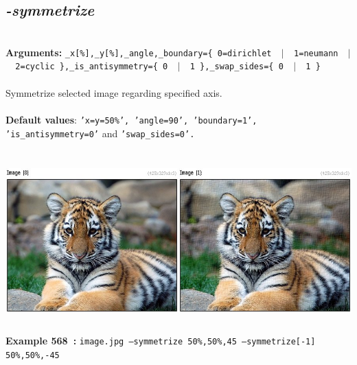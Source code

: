 \documentclass[a4paper,11pt,twoside]{book}
\begin{document}
\subsection{\emph{-symmetrize} }\vspace*{-0.5em}
~\\\textbf{Arguments: } 
{\small \texttt{\_x[\%],\_y[\%],\_angle,\_boundary=\{ 0=dirichlet ~$|$~ 1=neumann ~$|$~ 2=cyclic \},\_is\_antisymmetry=\{ 0 ~$|$~ 1 \},\_swap\_sides=\{ 0 ~$|$~ 1 \}}}\\~\\
Symmetrize selected image regarding specified axis.
~\\~\\\textbf{Default values}: {\small \texttt{'x=y=50\%', 'angle=90', 'boundary=1', 'is\_antisymmetry=0'} and \texttt{'swap\_sides=0'.}}
\begin{center}\includegraphics[keepaspectratio=true,height=7cm,width=\textwidth]{img/gmic_def568.jpg}\\
{\footnotesize \textbf{Example 568~:} \texttt{image.jpg --symmetrize 50\%,50\%,45 --symmetrize[-1] 50\%,50\%,-45}}
\end{center}
\end{document}
